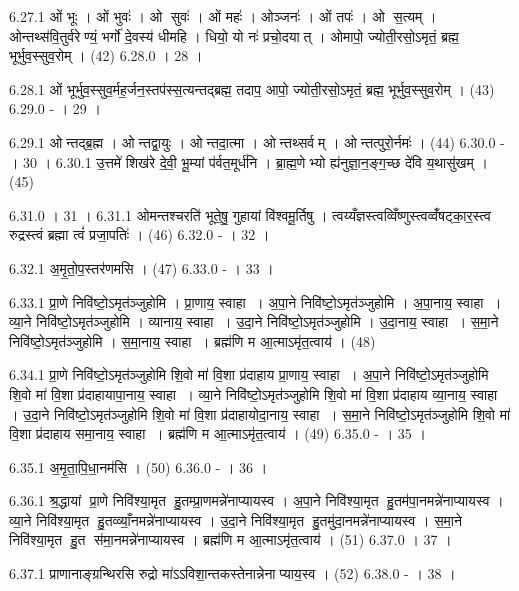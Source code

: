6.27.1
ओं भूः । ओं भुवः॑ । ओ सुवः॑ । ओं महः॑ । ओञ्जनः॑ । ओं तपः॑ । ओ स॒त्यम् । ओन्तथ्स॑वि॒तुर्वरेण्यं॒ भर्गो॑ दे॒वस्य॑ धीमहि । धियो॒ यो नः॑ प्रचो॒दयात् । ओमापो॒ ज्योती॒रसो॒ऽमृतं॒ ब्रह्म॒ भूर्भुव॒स्सुव॒रोम् । (42)
6.28.0
। 28 ।
\anuvakamend

6.28.1
ओं भूर्भुव॒स्सुव॒र्मह॒र्जन॒स्तप॑स्स॒त्यन्तद्ब्रह्म॒ तदाप॒ आपो॒ ज्योती॒रसो॒ऽमृतं॒ ब्रह्म॒ भूर्भुव॒स्सुव॒रोम् । (43)
6.29.0
- । 29 ।
\anuvakamend

6.29.1
ओन्तद्ब्र॒ह्म । ओन्तद्वा॒युः । ओन्तदा॒त्मा । ओन्तथ्सर्वम् । ओन्तत्पुरो॒र्नमः॑ । (44)
6.30.0
- । 30 ।
6.30.1
उ॒त्तमे॑ शिख॑रे दे॒वी॒ भू॒म्यां प॑र्वत॒मूर्ध॑नि । ब्रा॒ह्म॒णेभ्यो ह्य॑नुज्ञा॒न॒ङ्ग॒च्छ दे॑वि य॒थासु॑खम् । (45)
\anuvakamend

6.31.0
। 31 ।
6.31.1
ओमन्तश्चरति॑ भूते॒षु॒ गुहायां वि॑श्वमू॒र्तिषु । त्वय्यँज्ञस्त्वव्विँष्णुस्त्वव्वँ॑षट्का॒र॒स्त्व रुद्रस्त्वं ब्रह्मा त्वं॑ प्रजा॒पतिः॑ । (46)
6.32.0
- । 32 ।
\anuvakamend

6.32.1
अ॒मृ॒तो॒प॒स्तर॑णमसि । (47)
6.33.0
- । 33 ।
\anuvakamend

6.33.1
प्रा॒णे निवि॑ष्टो॒ऽमृत॑ञ्जुहोमि । प्रा॒णाय॒ स्वाहा । अ॒पा॒ने निवि॑ष्टो॒ऽमृत॑ञ्जुहोमि । अ॒पा॒नाय॒ स्वाहा । व्या॒ने निवि॑ष्टो॒ऽमृत॑ञ्जुहोमि । व्यानाय॒ स्वाहा । उ॒दा॒ने निवि॑ष्टो॒ऽमृत॑ञ्जुहोमि । उ॒दा॒नाय॒ स्वाहा । स॒मा॒ने निवि॑ष्टो॒ऽमृत॑ञ्जुहोमि । स॒मा॒नाय॒ स्वाहा । ब्रह्म॑णि म आ॒त्माऽमृ॑त॒त्वाय॑ । (48)
\anuvakamend

6.34.1
प्रा॒णे निवि॑ष्टो॒ऽमृत॑ञ्जुहोमि शि॒वो मा॑ वि॒शा प्र॑दाहाय प्रा॒णाय॒ स्वाहा । अ॒पा॒ने निवि॑ष्टो॒ऽमृत॑ञ्जुहोमि शि॒वो मा॑ वि॒शा प्र॑दाहायापा॒नाय॒ स्वाहा । व्या॒ने निवि॑ष्टो॒ऽमृत॑ञ्जुहोमि शि॒वो मा॑ वि॒शा प्र॑दाहाय व्या॒नाय॒ स्वाहा । उ॒दा॒ने निवि॑ष्टो॒ऽमृत॑ञ्जुहोमि शि॒वो मा॑ वि॒शा प्र॑दाहायोदा॒नाय॒ स्वाहा । स॒मा॒ने निवि॑ष्टो॒ऽमृत॑ञ्जुहोमि शि॒वो मा॑ वि॒शा प्र॑दाहाय समा॒नाय॒ स्वाहा । ब्रह्म॑णि म आ॒त्माऽमृ॑त॒त्वाय॑ । (49)
6.35.0
- । 35 ।
\anuvakamend

6.35.1
अ॒मृ॒ता॒पि॒धा॒नम॑सि । (50)
6.36.0
- । 36 ।
\anuvakamend

6.36.1
श्र॒द्धायां प्रा॒णे निवि॑श्या॒मृत हु॒तम्प्रा॒णमन्ने॑नाप्यायस्व । अ॒पा॒ने निवि॑श्या॒मृत हु॒तम॑पा॒नमन्ने॑नाप्यायस्व । व्या॒ने निवि॑श्या॒मृत हु॒तव्व्याँ॒नमन्ने॑नाप्यायस्व । उ॒दा॒ने निवि॑श्या॒मृत हु॒तमु॑दा॒नमन्ने॑नाप्यायस्व । स॒मा॒ने निवि॑श्या॒मृत हु॒त स॑मा॒नमन्ने॑नाप्यायस्व । ब्रह्म॑णि म आ॒त्माऽमृ॑त॒त्वाय॑ । (51)
6.37.0
। 37 ।
\anuvakamend

6.37.1
प्राणानाङ्ग्रन्थिरसि रुद्रो मा॑ऽऽविशा॒न्तकस्तेनान्नेनाप्याय॒स्व । (52)
6.38.0
- । 38 ।
\anuvakamend

